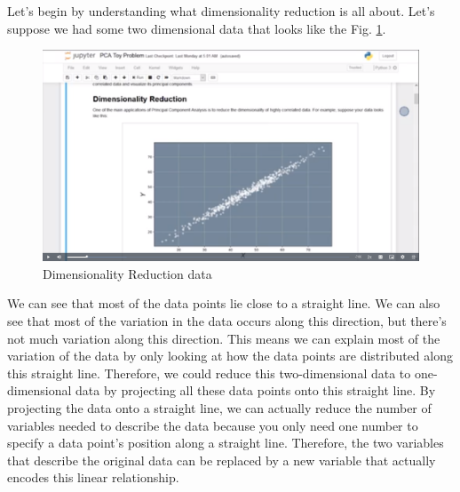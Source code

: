 Let's begin by understanding what dimensionality reduction is all about.
Let's suppose we had some two dimensional data that looks like the Fig.
\ref{fig:dimensionality_reduction}.

\begin{figure}[htp]
  \centering
  \includegraphics[width=\linewidth]{img/dimensionality_reduction.png}
  \caption{Dimensionality Reduction data}
  \label{fig:dimensionality_reduction}
\end{figure}

We can see that most of the data points lie close to a straight line. We
can also see that most of the variation in the data occurs along this
direction, but there's not much variation along this direction. This
means we can explain most of the variation of the data by only looking
at how the data points are distributed along this straight line.
Therefore, we could reduce this two-dimensional data to one-dimensional
data by projecting all these data points onto this straight line. By
projecting the data onto a straight line, we can actually reduce the
number of variables needed to describe the data because you only need
one number to specify a data point's position along a straight line.
Therefore, the two variables that describe the original data can be
replaced by a new variable that actually encodes this linear
relationship.

